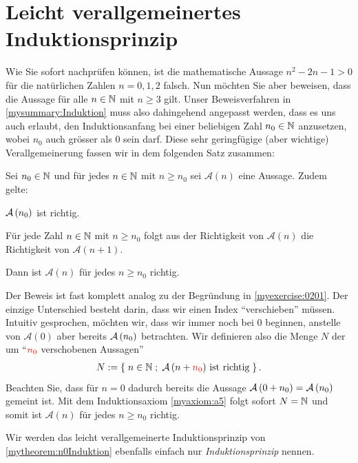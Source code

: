 \section{Leicht verallgemeinertes Induktionsprinzip}
Wie Sie sofort nachprüfen können, ist die mathematische Aussage $n^2 - 2n - 1 > 0$ für die natürlichen Zahlen $n = 0, 1, 2$ falsch. Nun möchten Sie aber beweisen, dass die Aussage für alle $n\in\mathbb{N}$ mit $n\geq 3$ gilt. Unser Beweisverfahren in \cref{mysummary:Induktion} muss also dahingehend angepasst werden, dass es uns auch erlaubt, den Induktionsanfang bei einer beliebigen Zahl $n_0\in\mathbb{N}$ anzusetzen, wobei $n_0$ auch grösser als $0$ sein darf. Diese sehr geringfügige (aber wichtige) Verallgemeinerung fassen wir in dem folgenden Satz zusammen:
\begin{mytheorem}\label{mytheorem:n0Induktion}

	Sei $n_0\in\mathbb{N}$ und für jedes $n\in\mathbb{N}$ mit $n\geq n_0$ sei $\mathcal{A}(n)$ eine Aussage. Zudem gelte:
	\begin{renum}
		\item $\mathcal{A}\left(n_0\right)$ ist richtig.
		\item Für jede Zahl $n\in\mathbb{N}$ mit $n\geq n_0$ folgt aus der Richtigkeit von $\mathcal{A}(n)$ die Richtigkeit von $\mathcal{A}(n+1)$.
	\end{renum}
	Dann ist $\mathcal{A}(n)$ für jedes $n\geq n_0$ richtig.
\end{mytheorem}
\begin{myproof}
	Der Beweis ist fast komplett analog zu der Begründung in \cref{myexercise:0201}. Der einzige Unterschied besteht darin, dass wir einen Index \enquote{verschieben} müssen. Intuitiv gesprochen, möchten wir, dass wir immer noch bei $0$ beginnen, anstelle von $\mathcal{A}(0)$ aber bereits $\mathcal{A}\left(n_0\right)$ betrachten. Wir definieren also die Menge $N$ der um \enquote{$\textcolor{Red}{n_0}$ verschobenen Aussagen}
	\begin{align*}
		N := \setct{n\in\N}{$\mathcal{A}\lr{n+\textcolor{Red}{n_0}}$ ist richtig}.
	\end{align*}
	Beachten Sie, dass für $n=0$ dadurch bereits die Aussage $\mathcal{A}\left(0+n_0\right)=\mathcal{A}\left(n_0\right)$ gemeint ist. Mit dem Induktionsaxiom \ref{myaxiom:a5} folgt sofort $N=\mathbb{N}$ und somit ist $\mathcal{A}(n)$ für jedes $n\geq n_0$ richtig.
\end{myproof}

\begin{myremark}
	Wir werden das leicht verallgemeinerte Induktionsprinzip von \cref{mytheorem:n0Induktion} ebenfalls einfach nur \textit{Induktionsprinzip} nennen.
\end{myremark}

